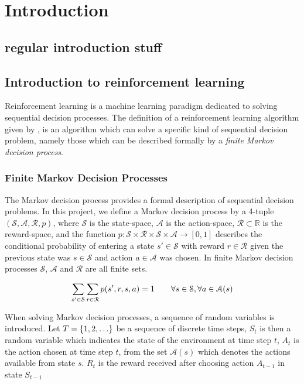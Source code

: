 \section{Introduction}

\subsection{regular introduction stuff}

\subsection{Introduction to reinforcement learning}
Reinforcement learning is a machine learning paradigm dedicated to solving sequential decision processes. The definition of a reinforcement learning algorithm given by \citet{RLBook2018}, is an algorithm which can solve a specific kind of sequential decision problem, namely those which can be described formally by a \textit{finite Markov decision process}.


\subsubsection{Finite Markov Decision Processes}

The Markov decision process provides a formal description of sequential decision problems. 
In this project, we define a Markov decision process by a 4-tuple $(\mathcal{S},\mathcal{A},\mathcal{R}, p)$, where $\mathcal{S}$ is the state-space, $\mathcal{A}$ is the action-space, $\mathcal{R} \subset \mathbb{R}$ is the reward-space, and the function $p : \mathcal{S} \times \mathcal{R} \times \mathcal{S} \times \mathcal{A} \rightarrow [0,1]$ describes the conditional probability of entering a state $s' \in \mathcal{S}$ with reward $r \in \mathcal{R}$ given the previous state was $s \in \mathcal{S}$ and action $a \in \mathcal{A}$ was chosen.
In finite Markov decision processes $\mathcal{S}$, $\mathcal{A}$ and $\mathcal{R}$ are all finite sets. 

\begin{align}
    \sum_{s' \in \mathcal{S}}\sum_{r \in \mathcal{R}} p(s', r, s, a) = 1 \qquad \forall s \in \mathcal{S}, \forall a \in \mathcal{A}(s)
\end{align}

\vspace*{0.5cm}

When solving Markov decision processes, a sequence of random variables is introduced. Let $T = \left\{1, 2, \ldots\right\}$ be a sequence of discrete time steps, $S_t$ is then a random variable which indicates the state of the environment at time step $t$, $A_t$ is the action chosen at time step $t$, from the set $\mathcal{A}(s)$ which denotes the actions available from state $s$. 
$R_t$ is the reward received after choosing action $A_{t-1}$ in state $S_{t-1}$

